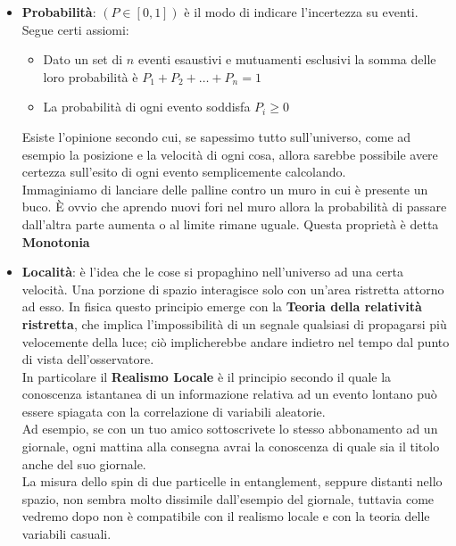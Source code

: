 \documentclass{article}
\begin{document}
\begin{itemize}
    \item \textbf{Probabilità}: $(P\in [0,1])$   è il modo di indicare l'incertezza su eventi. Segue certi assiomi:
    \begin{itemize}
        \item Dato un set di $n$ eventi esaustivi e mutuamenti esclusivi la somma delle loro probabilità è $P_1 + P_2+\dots+P_n = 1$
        \item La probabilità di ogni evento soddisfa $P_i\ge0$
    \end{itemize}
Esiste l'opinione secondo cui, se sapessimo tutto sull'universo, come ad esempio la posizione e la velocità di ogni cosa, allora sarebbe possibile avere certezza sull'esito di ogni evento semplicemente calcolando.
    \medskip
    \\
    Immaginiamo di lanciare delle palline contro un muro in cui è presente un buco. È ovvio che aprendo nuovi fori nel muro allora la probabilità di passare dall'altra parte aumenta o al limite rimane uguale. Questa proprietà è detta \textbf{Monotonia}

    \item \textbf{Località}:  è l'idea che le cose si propaghino nell'universo ad una certa velocità. Una porzione di spazio interagisce solo con un'area ristretta attorno ad esso. In fisica questo principio emerge con la \textbf{Teoria della relatività ristretta}, che implica l'impossibilità di un segnale qualsiasi di propagarsi più velocemente della luce; ciò implicherebbe andare indietro nel tempo dal punto di vista dell'osservatore.
    \medskip
    \\
    In particolare il \textbf{Realismo Locale} è il principio secondo il quale la conoscenza istantanea di un informazione relativa ad un evento lontano può essere spiagata con la correlazione di variabili aleatorie.
    \\Ad esempio, se con un tuo amico sottoscrivete lo stesso abbonamento ad un giornale, ogni mattina alla consegna avrai la conoscenza di quale sia il titolo anche del suo giornale.
    \\La misura dello spin di due particelle in entanglement, seppure distanti nello spazio, non sembra molto dissimile dall'esempio del giornale, tuttavia come vedremo dopo non è compatibile con il realismo locale e con la teoria delle variabili casuali.


\end{itemize}
\end{document}
